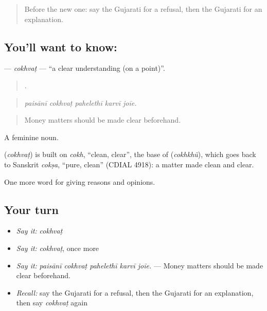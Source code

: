 \label{lesson:GU-C345-cokhvat}



\begin{quote}
Before the new one: say the Gujarati for a refusal, then the Gujarati for an explanation.
\end{quote}

\subsection*{You'll want to know: }
\textbf{} — \emph{cokhvaṭ} — \textquotedblleft{}a clear understanding (on a point)\textquotedblright{}.

\begin{quote}
    .
\end{quote}

\begin{quote}
\emph{paisānī cokhvaṭ pahelethī karvī joīe.}
\end{quote}

\begin{quote}
Money matters should be made clear beforehand.
\end{quote}

A feminine noun.

\begin{cousinweb}
\textbf{} (\emph{cokhvaṭ}) is built on \emph{cokh}, \textquotedblleft{}clean, clear\textquotedblright{}, the base of \textbf{} (\emph{cokhkhũ}), which goes back to Sanskrit \emph{cokṣa}, \textquotedblleft{}pure, clean\textquotedblright{} (CDIAL 4918): a matter made clean and clear.
\end{cousinweb}

\begin{grammarlens}[title={What you've built}]
One more word for giving reasons and opinions.
\end{grammarlens}

\subsection*{Your turn}
\begin{itemize}
\raggedright
  \item \emph{Say it:} \emph{cokhvaṭ}
  \item \emph{Say it:} \emph{cokhvaṭ}, once more
  \item \emph{Say it:} \emph{paisānī cokhvaṭ pahelethī karvī joīe.} — Money matters should be made clear beforehand.
  \item \emph{Recall:} say the Gujarati for a refusal, then the Gujarati for an explanation, then say \emph{cokhvaṭ} again
\end{itemize}

